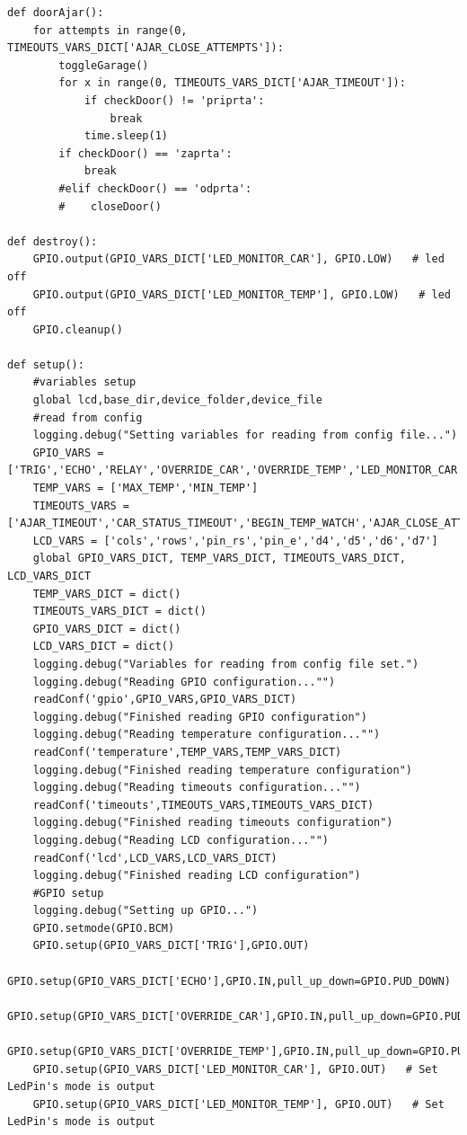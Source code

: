 \documentclass[11pt]{article}
\begin{document}
\begin{verbatim}
def doorAjar():
    for attempts in range(0, TIMEOUTS_VARS_DICT['AJAR_CLOSE_ATTEMPTS']):
        toggleGarage()
        for x in range(0, TIMEOUTS_VARS_DICT['AJAR_TIMEOUT']):
            if checkDoor() != 'priprta':
                break
            time.sleep(1)
        if checkDoor() == 'zaprta':
            break
        #elif checkDoor() == 'odprta':
        #    closeDoor()

def destroy():
    GPIO.output(GPIO_VARS_DICT['LED_MONITOR_CAR'], GPIO.LOW)   # led off
    GPIO.output(GPIO_VARS_DICT['LED_MONITOR_TEMP'], GPIO.LOW)   # led off
    GPIO.cleanup()

def setup():
    #variables setup
    global lcd,base_dir,device_folder,device_file
    #read from config
    logging.debug("Setting variables for reading from config file...")
    GPIO_VARS = ['TRIG','ECHO','RELAY','OVERRIDE_CAR','OVERRIDE_TEMP','LED_MONITOR_CAR','LED_MONITOR_TEMP','REED_OPEN','REED_CLOSED']
    TEMP_VARS = ['MAX_TEMP','MIN_TEMP']
    TIMEOUTS_VARS = ['AJAR_TIMEOUT','CAR_STATUS_TIMEOUT','BEGIN_TEMP_WATCH','AJAR_CLOSE_ATTEMPTS']
    LCD_VARS = ['cols','rows','pin_rs','pin_e','d4','d5','d6','d7']
    global GPIO_VARS_DICT, TEMP_VARS_DICT, TIMEOUTS_VARS_DICT, LCD_VARS_DICT
    TEMP_VARS_DICT = dict()
    TIMEOUTS_VARS_DICT = dict()
    GPIO_VARS_DICT = dict()
    LCD_VARS_DICT = dict()
    logging.debug("Variables for reading from config file set.")
    logging.debug("Reading GPIO configuration..."")
    readConf('gpio',GPIO_VARS,GPIO_VARS_DICT)
    logging.debug("Finished reading GPIO configuration")
    logging.debug("Reading temperature configuration..."")
    readConf('temperature',TEMP_VARS,TEMP_VARS_DICT)
    logging.debug("Finished reading temperature configuration")
    logging.debug("Reading timeouts configuration..."")
    readConf('timeouts',TIMEOUTS_VARS,TIMEOUTS_VARS_DICT)
    logging.debug("Finished reading timeouts configuration")
    logging.debug("Reading LCD configuration..."")
    readConf('lcd',LCD_VARS,LCD_VARS_DICT)
    logging.debug("Finished reading LCD configuration")
    #GPIO setup
    logging.debug("Setting up GPIO...")
    GPIO.setmode(GPIO.BCM)
    GPIO.setup(GPIO_VARS_DICT['TRIG'],GPIO.OUT)
    GPIO.setup(GPIO_VARS_DICT['ECHO'],GPIO.IN,pull_up_down=GPIO.PUD_DOWN)
    GPIO.setup(GPIO_VARS_DICT['OVERRIDE_CAR'],GPIO.IN,pull_up_down=GPIO.PUD_DOWN)
    GPIO.setup(GPIO_VARS_DICT['OVERRIDE_TEMP'],GPIO.IN,pull_up_down=GPIO.PUD_DOWN)
    GPIO.setup(GPIO_VARS_DICT['LED_MONITOR_CAR'], GPIO.OUT)   # Set LedPin's mode is output
    GPIO.setup(GPIO_VARS_DICT['LED_MONITOR_TEMP'], GPIO.OUT)   # Set LedPin's mode is output

\end{verbatim}
\end{document}
